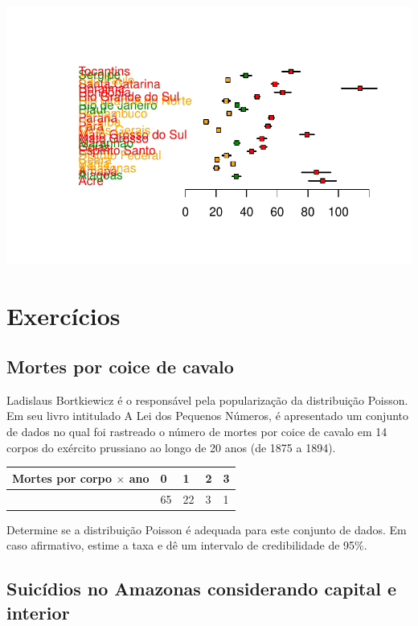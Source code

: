 \documentclass[
  letterpaper,
  DIV=11,
  numbers=noendperiod]{scrreprt}
\theoremstyle{definition}
\theoremstyle{plain}
\theoremstyle{definition}
\theoremstyle{remark}
\begin{document}
\includegraphics{poisson_files/figure-pdf/unnamed-chunk-9-1.pdf}

\section{Exercícios}\label{exercuxedcios-2}

\subsection{Mortes por coice de
cavalo}\label{mortes-por-coice-de-cavalo}

Ladislaus Bortkiewicz é o responsável pela popularização da distribuição
Poisson. Em seu livro intitulado A Lei dos Pequenos Números, é
apresentado um conjunto de dados no qual foi rastreado o número de
mortes por coice de cavalo em 14 corpos do exército prussiano ao longo
de 20 anos (de 1875 a 1894).

\begin{longtable}[]{@{}lllll@{}}
\toprule\noalign{}
Mortes por corpo \(\times\) ano & 0 & 1 & 2 & 3 \\
\midrule\noalign{}
\endhead
\bottomrule\noalign{}
\endlastfoot
109 & 65 & 22 & 3 & 1 \\
\end{longtable}

Determine se a distribuição Poisson é adequada para este conjunto de
dados. Em caso afirmativo, estime a taxa e dê um intervalo de
credibilidade de 95\%.

\subsection{Suicídios no Amazonas considerando capital e
interior}\label{suicuxeddios-no-amazonas-considerando-capital-e-interior}
\end{document}
